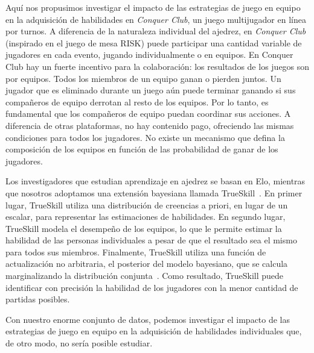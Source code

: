 \documentclass[a4paper,11pt]{book}
\theoremstyle{definition}
\begin{document}
Aqu\'i nos propusimos investigar el impacto de las estrategias de juego en equipo en la adquisici\'on de habilidades en \emph{Conquer Club}, un juego multijugador en l\'inea por turnos.
%
A diferencia de la naturaleza individual del ajedrez, en \emph{Conquer Club} (inspirado en el juego de mesa RISK) puede participar una cantidad variable de jugadores en cada evento, jugando individualmente o en equipos.
%
En Conquer Club hay un fuerte incentivo para la colaboraci\'on: los resultados de los juegos son por equipos.
%
Todos los miembros de un equipo ganan o pierden juntos.
%
Un jugador que es eliminado durante un juego a\'un puede terminar ganando si sus compa\~neros de equipo derrotan al resto de los equipos.
%
Por lo tanto, es fundamental que los compa\~neros de equipo puedan coordinar sus acciones.
%
A diferencia de otras plataformas, no hay contenido pago, ofreciendo las mismas condiciones para todos los jugadores.
%
No existe un mecanismo que defina la composici\'on de los equipos en funci\'on de las probabilidad de ganar de los jugadores.
%


Los investigadores que estudian aprendizaje en ajedrez se basan en Elo, mientras que nosotros adoptamos una extensi\'on bayesiana llamada TrueSkill~\cite{Herbrich2007}.
%
En primer lugar, TrueSkill utiliza una distribuci\'on de creencias a priori, en lugar de un escalar, para representar las estimaciones de habilidades.
%
En segundo lugar, TrueSkill modela el desempe\~no de los equipos, lo que le permite estimar la habilidad de las personas individuales a pesar de que el resultado sea el mismo para todos sus miembros.
%
Finalmente, TrueSkill utiliza una funci\'on de actualizaci\'on no arbitraria, el posterior del modelo bayesiano, que se calcula marginalizando la distribuci\'on conjunta~\cite{Kschischang2001}.
%
Como resultado, TrueSkill puede identificar con precisi\'on la habilidad de los jugadores con la menor cantidad de partidas posibles.

%

Con nuestro enorme conjunto de datos, podemos investigar el impacto de las estrategias de juego en equipo en la adquisici\'on de habilidades individuales que, de otro modo, no ser\'ia posible estudiar.
\end{document}
